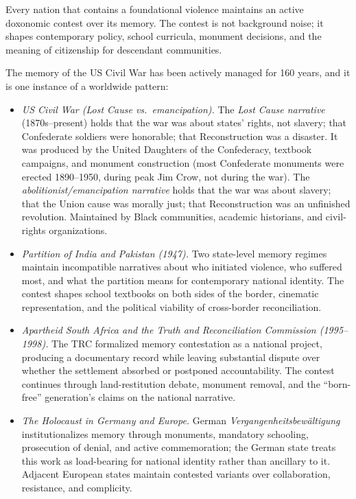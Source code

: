 Every nation that contains a foundational violence maintains an active doxonomic contest over its memory. The contest is not background noise; it shapes contemporary policy, school curricula, monument decisions, and the meaning of citizenship for descendant communities.

\begin{example}
\label{ex:memory-contest}
The memory of the US Civil War has been actively managed for 160 years, and it is one instance of a worldwide pattern:
\begin{itemize}[nosep]
  \item \emph{US Civil War (Lost Cause vs.\ emancipation).} The \emph{Lost Cause narrative} (1870s--present) holds that the war was about states' rights, not slavery; that Confederate soldiers were honorable; that Reconstruction was a disaster. It was produced by the United Daughters of the Confederacy, textbook campaigns, and monument construction (most Confederate monuments were erected 1890--1950, during peak Jim Crow, not during the war). The \emph{abolitionist/emancipation narrative} holds that the war was about slavery; that the Union cause was morally just; that Reconstruction was an unfinished revolution. Maintained by Black communities, academic historians, and civil-rights organizations.
  \item \emph{Partition of India and Pakistan (1947).} Two state-level memory regimes maintain incompatible narratives about who initiated violence, who suffered most, and what the partition means for contemporary national identity. The contest shapes school textbooks on both sides of the border, cinematic representation, and the political viability of cross-border reconciliation.
  \item \emph{Apartheid South Africa and the Truth and Reconciliation Commission (1995--1998).} The TRC formalized memory contestation as a national project, producing a documentary record while leaving substantial dispute over whether the settlement absorbed or postponed accountability. The contest continues through land-restitution debate, monument removal, and the ``born-free'' generation's claims on the national narrative.
  \item \emph{The Holocaust in Germany and Europe.} German \emph{Vergangenheitsbewältigung} institutionalizes memory through monuments, mandatory schooling, prosecution of denial, and active commemoration; the German state treats this work as load-bearing for national identity rather than ancillary to it. Adjacent European states maintain contested variants over collaboration, resistance, and complicity.

\end{itemize}
\end{example}
